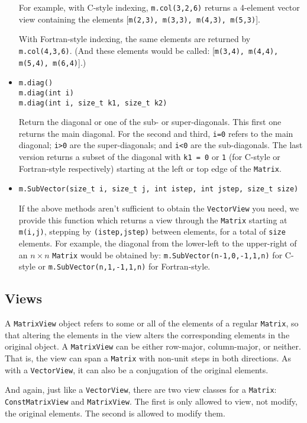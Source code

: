 \documentclass[twoside,letterpaper,11pt]{article}
\renewcommand{\tt}[1]{{\texttt {#1}}}
\begin{document}
\begin{itemize}
For example, with C-style indexing, \tt{m.col(3,2,6)} returns a 4-element
vector view containing the elements
[\tt{m(2,3), m(3,3), m(4,3), m(5,3)}].

With Fortran-style indexing, the same elements are returned by \tt{m.col(4,3,6)}. 
(And these elements would be called: [\tt{m(3,4), m(4,4), m(5,4), m(6,4)}].)

\item
\begin{verbatim}
m.diag()
m.diag(int i)
m.diag(int i, size_t k1, size_t k2)
\end{verbatim}
Return the diagonal or one of the sub- or super-diagonals.
This first one returns the main diagonal.  For the second and third,
\tt{i=0} refers to the main diagonal; \tt{i>0} are the super-diagonals;
and \tt{i<0} are the sub-diagonals.  The last version returns a subset
of the diagonal with \tt{k1 = 0} or \tt{1} (for C-style or Fortran-style
respectively) starting at the left or top edge of 
the \tt{Matrix}.

\item
\begin{verbatim}
m.SubVector(size_t i, size_t j, int istep, int jstep, size_t size)
\end{verbatim}
If the above methods aren't sufficient to obtain the \tt{VectorView} you
need, we provide this
function which returns a view through the \tt{Matrix} 
starting at \tt{m(i,j)}, stepping by \tt{(istep,jstep)} between elements,
for a total of \tt{size} elements.  For example, the diagonal
from the lower-left to the upper-right of an $n \times n$ \tt{Matrix} 
would be obtained by: \tt{m.SubVector(n-1,0,-1,1,n)} for C-style or
\tt{m.SubVector(n,1,-1,1,n)} for Fortran-style.

\end{itemize}


\subsection{Views}
\label{MViews}

A \tt{MatrixView} object refers to some or all of the elements of a regular \tt{Matrix},
so that altering the elements in the view alters the
corresponding elements in the original object.  A \tt{MatrixView}
can be either row-major, column-major, or neither.  That is, the view can 
span a \tt{Matrix} with non-unit steps in both directions.
As with a \tt{VectorView}, it can also be a conjugation of the original
elements.

And again, just like a \tt{VectorView}, there are two view classes for
a \tt{Matrix}:
\tt{ConstMatrixView} and \tt{MatrixView}.  
The first is only allowed to view,
not modify, the original elements.  The second is allowed to modify them.
\end{document}
